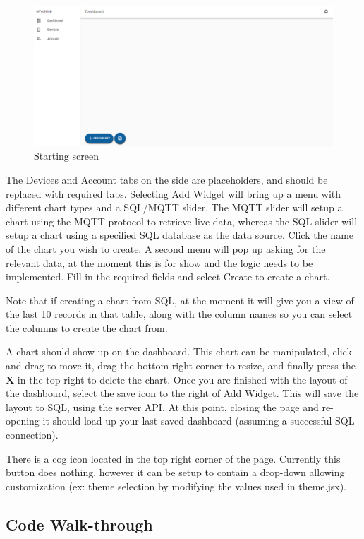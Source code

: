 \documentclass[12pt, titlepage]{article}
\begin{document}
\begin{figure}[H]
\centering
\includegraphics[width=0.9\linewidth]{./assets/Dash.PNG}
\caption{Starting screen}
\label{fig:dash}
\end{figure}

The Devices and Account tabs on the side are placeholders, and should be replaced with required tabs. Selecting Add Widget will bring up a menu with different chart types and a SQL/MQTT slider. The MQTT slider will setup a chart using the MQTT protocol to retrieve live data, whereas the SQL slider will setup a chart using a specified SQL database as the data source. Click the name of the chart you wish to create. A second menu will pop up asking for the relevant data, at the moment this is for show and the logic needs to be implemented. Fill in the required fields and select Create to create a chart.

Note that if creating a chart from SQL, at the moment it will give you a view of the last 10 records in that table, along with the column names so you can select the columns to create the chart from.

A chart should show up on the dashboard. This chart can be manipulated, click and drag to move it, drag the bottom-right corner to resize, and finally press the \textbf{X} in the top-right to delete the chart. Once you are finished with the layout of the dashboard, select the save icon to the right of Add Widget. This will save the layout to SQL, using the server API. At this point, closing the page and re-opening it should load up your last saved dashboard (assuming a successful SQL connection).

There is a cog icon located in the top right corner of the page. Currently this button does nothing, however it can be setup to contain a drop-down allowing customization (ex: theme selection by modifying the values used in theme.jsx).

\subsection{Code Walk-through}
\end{document}
